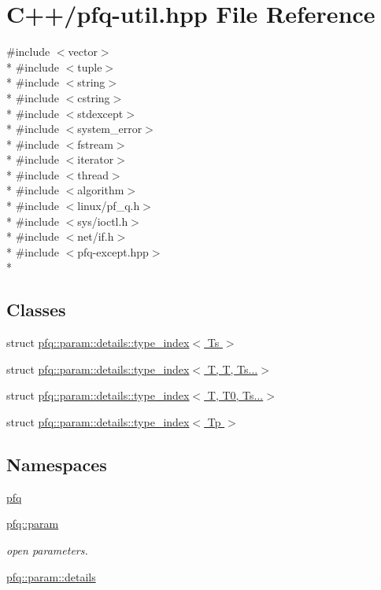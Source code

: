 \hypertarget{pfq-util_8hpp}{\section{C++/pfq-\/util.hpp File Reference}
\label{pfq-util_8hpp}
}
{\ttfamily \#include $<$vector$>$}\\*
{\ttfamily \#include $<$tuple$>$}\\*
{\ttfamily \#include $<$string$>$}\\*
{\ttfamily \#include $<$cstring$>$}\\*
{\ttfamily \#include $<$stdexcept$>$}\\*
{\ttfamily \#include $<$system\+\_\+error$>$}\\*
{\ttfamily \#include $<$fstream$>$}\\*
{\ttfamily \#include $<$iterator$>$}\\*
{\ttfamily \#include $<$thread$>$}\\*
{\ttfamily \#include $<$algorithm$>$}\\*
{\ttfamily \#include $<$linux/pf\+\_\+q.\+h$>$}\\*
{\ttfamily \#include $<$sys/ioctl.\+h$>$}\\*
{\ttfamily \#include $<$net/if.\+h$>$}\\*
{\ttfamily \#include $<$pfq-\/except.\+hpp$>$}\\*
\subsection*{Classes}
\begin{DoxyCompactItemize}
\item 
struct \hyperlink{structpfq_1_1param_1_1details_1_1type__index}{pfq\+::param\+::details\+::type\+\_\+index$<$ Ts $>$}
\item 
struct \hyperlink{structpfq_1_1param_1_1details_1_1type__index_3_01T_00_01T_00_01Ts_8_8_8_4}{pfq\+::param\+::details\+::type\+\_\+index$<$ T, T, Ts...$>$}
\item 
struct \hyperlink{structpfq_1_1param_1_1details_1_1type__index_3_01T_00_01T0_00_01Ts_8_8_8_4}{pfq\+::param\+::details\+::type\+\_\+index$<$ T, T0, Ts...$>$}
\item 
struct \hyperlink{structpfq_1_1param_1_1details_1_1type__index_3_01Tp_01_4}{pfq\+::param\+::details\+::type\+\_\+index$<$ Tp $>$}
\end{DoxyCompactItemize}
\subsection*{Namespaces}
\begin{DoxyCompactItemize}
\item 
 \hyperlink{namespacepfq}{pfq}
\item 
 \hyperlink{namespacepfq_1_1param}{pfq\+::param}
\begin{DoxyCompactList}\small\item\em open parameters. \end{DoxyCompactList}\item 
 \hyperlink{namespacepfq_1_1param_1_1details}{pfq\+::param\+::details}
\end{DoxyCompactItemize}
